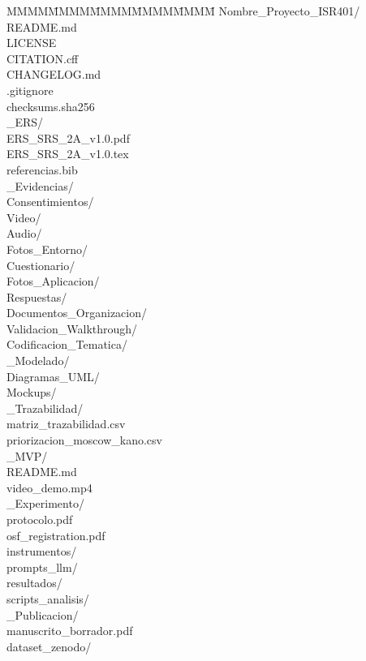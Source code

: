 \documentclass[11pt,a4paper]{article}
\begin{document}
\begin{evidbox}[title=Árbol de carpetas obligatorio de la Entrega 3 (2A)]
\begingroup
    \small\ttfamily
    \begin{tabbing}
        MMMM\=MMMM\=MMMM\=MMMM\=MMMM\=\kill
        Nombre\_Proyecto\_ISR401/\\
        \>README.md\\
        \>LICENSE\\
        \>CITATION.cff\\
        \>CHANGELOG.md\\
        \>.gitignore\\
        \>checksums.sha256\\
        \_ERS/\\
        \>\>ERS\_SRS\_2A\_v1.0.pdf\\
        \>\>ERS\_SRS\_2A\_v1.0.tex\\
        \>\>referencias.bib\\
        \_Evidencias/\\
        \>\>Consentimientos/\\
        \>\>Video/\\
        \>\>Audio/\\
        \>\>Fotos\_Entorno/\\
        \>\>Cuestionario/\\
        \>\>\>Fotos\_Aplicacion/\\
        \>\>\>Respuestas/\\
        \>\>Documentos\_Organizacion/\\
        \>\>Validacion\_Walkthrough/\\
        \>\>Codificacion\_Tematica/\\
        \_Modelado/\\
        \>\>Diagramas\_UML/\\
        \>\>Mockups/\\
        \_Trazabilidad/\\
        \>\>matriz\_trazabilidad.csv\\
        \>\>priorizacion\_moscow\_kano.csv\\
        \_MVP/\\
        \>\>README.md\\
        \>\>video\_demo.mp4\\
        \_Experimento/\\
        \>\>protocolo.pdf\\
        \>\>osf\_registration.pdf\\
        \>\>instrumentos/\\
        \>\>prompts\_llm/\\
        \>\>resultados/\\
        \>\>scripts\_analisis/\\
        \_Publicacion/\\
        \>\>manuscrito\_borrador.pdf\\
        \>\>dataset\_zenodo/
    \end{tabbing}
\endgroup
\end{evidbox}
\end{document}
